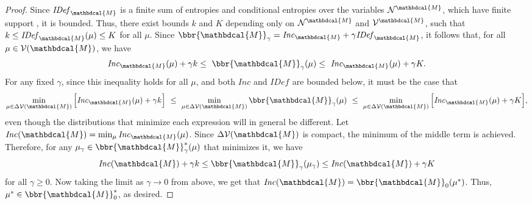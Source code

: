 \documentclass[letterpaper]{article} %
\theoremstyle{plain}
\theoremstyle{definition}
\theoremstyle{remark}
\newcommand{\commentout}[1]{\ignorespaces}
\newcommand{\V}{\mathcal V}
\newcommand{\N}{\mathcal N}
\newcommand{\dg}[1]{\mathbdcal{#1}}
\newcommand{\IDef}[1]{\mathit{IDef}_{#1}}
\newcommand\Inc{\mathit{Inc}}
\begin{document}
\begin{proof}
\def\lb{k}
\def\ub{K}  

Since $\IDef{\dg M}$ is a finite sum of entropies
and conditional entropies over the variables $\N^{\dg M}$, which have finite support%
, it is bounded.
Thus, there exist bounds $k$ and $K$ depending only on $\N^{\dg M}$ and
$\V^{\dg M}$, such that $\lb \leq \IDef{\dg M}(\mu) \leq \ub$ for all $\mu$.
%
Since $\bbr{\dg M}_\gamma = \Inc_{\dg M} + \gamma \IDef{\dg M}$,
it follows that, for all $\mu \in \V(\dg M)$, we have
\[ \Inc_{\dg M}( \mu) + \gamma\lb \leq~ \bbr{\dg M }_\gamma(\mu) 
\leq~  \Inc_{\dg M}( \mu) + \gamma\ub. \]
For any fixed $\gamma$, since this inequality holds for all $\mu$, and
both $\Inc$ and $\IDef{}$ are bounded below, it must be the case that  
\[
\min_{\mu \in \Delta\V(\dg M)} \Big[ \Inc_{\dg M}( \mu) + \gamma\lb \Big]
~\leq~ \min_{\mu \in \Delta\V(\dg M)}\bbr{\dg M }_\gamma(\mu) ~\leq~
\min_{\mu \in \Delta\V(\dg M)} \Big[ \Inc_{\dg M}( \mu) + \gamma\ub
    \Big], \] 
even though the distributions that minimize each expression will in general be different.
Let $\Inc(\dg M) = \min_{\mu} \Inc_{\dg M}(\mu)$.
Since $\Delta\V(\dg M)$ is compact, the minimum of the middle term is
achieved.  
Therefore, for any $\mu_\gamma \in \bbr{\dg M}^*_\gamma(\mu)$ that minimizes it, we have
$$\Inc(\dg M) +\gamma \lb \le \bbr{\dg M }_\gamma(\mu_\gamma) \le
		 \Inc(\dg M) +\gamma \ub$$ for all $\gamma \ge 0.$
Now taking the limit as $\gamma\rightarrow 0$ from above, we get that
$\Inc(\dg M) = \bbr{\dg M }_0(\mu^*)$.
Thus, $\mu^* \in \bbr{\dg M}_0^*$, as desired.
\commentout{

}
\end{proof}
\end{document}
